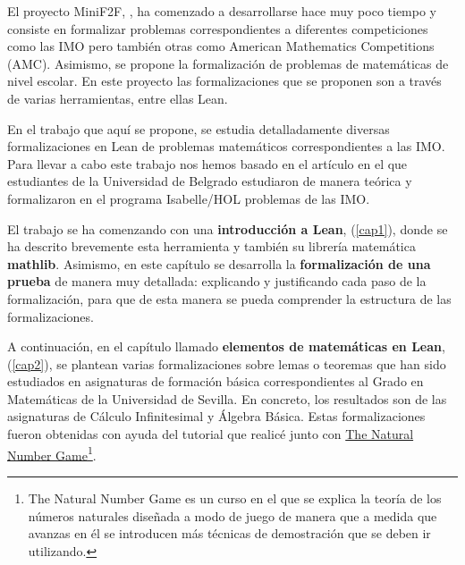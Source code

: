 El proyecto MiniF2F, \cite{mini}, ha comenzado a desarrollarse hace muy
poco tiempo y consiste en formalizar problemas correspondientes a
diferentes competiciones como las IMO pero también otras como American
Mathematics Competitions (AMC). Asimismo, se propone la formalización de
problemas de matemáticas de nivel escolar. En este proyecto las
formalizaciones que se proponen son a través de varias herramientas,
entre ellas Lean.

En el trabajo que aquí se propone, se estudia detalladamente diversas
formalizaciones en Lean de problemas matemáticos correspondientes a las
IMO. Para llevar a cabo este trabajo nos hemos basado en el artículo
\cite{ART} en el que estudiantes de la Universidad de Belgrado
estudiaron de manera teórica y formalizaron en el programa Isabelle/HOL
problemas de las IMO.

El trabajo se ha comenzando con una \textbf{introducción a Lean},
(\ref{cap1}), donde se ha descrito brevemente esta herramienta y también
su librería matemática \textbf{mathlib}. Asimismo, en este capítulo se
desarrolla la \textbf{formalización de una prueba} de manera muy
detallada: explicando y justificando cada paso de la formalización, para
que de esta manera se pueda comprender la estructura de las
formalizaciones.

A continuación, en el capítulo llamado \textbf{elementos de matemáticas
  en Lean}, (\ref{cap2}), se plantean varias formalizaciones sobre lemas
o teoremas que han sido estudiados en asignaturas de formación básica
correspondientes al Grado en Matemáticas de la Universidad de Sevilla.
En concreto, los resultados son de las asignaturas de Cálculo
Infinitesimal y Álgebra Básica. Estas formalizaciones fueron obtenidas
con ayuda del tutorial \cite{tutor} que realicé junto con
\href{https://www.ma.imperial.ac.uk/~buzzard/xena/natural_number_game/}{The
  Natural Number Game}\footnote{The Natural Number Game es un curso en
  el que se explica la teoría de los números naturales diseñada a modo
  de juego de manera que a medida que avanzas en él se introducen más
  técnicas de demostración que se deben ir utilizando.}.

